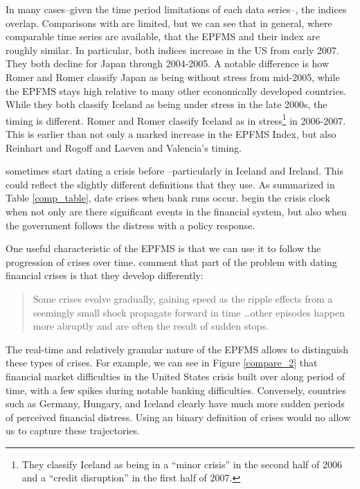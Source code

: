 \documentclass[]{article}
\begin{document}
In many cases--given the time period limitations of each data series--,
the indices overlap. Comparisons with \cite{Romer2015} are limited, but we can see that in general, where comparable time series are available, that the EPFMS and their index are roughly similar. In particular, both indices increase in the US from early 2007. They both decline for Japan through 2004-2005. A notable difference is
how Romer and Romer classify Japan as being without stress from
mid-2005, while the EPFMS stays high relative to many other economically
developed countries. While they both classify Iceland as being under
stress in the late 2000s, the timing is different. Romer and
Romer classify Iceland as in stress\footnote{They classify Iceland as
  being in a ``minor crisis'' in the second half of 2006 and a ``credit
  disruption'' in the first half of 2007.} in 2006-2007. This is earlier
than not only a marked increase in the EPFMS Index, but also Reinhart
and Rogoff and Laeven and Valencia's timing.

\cite{Reinhart2009} sometimes start dating a crisis before \cite{laeven2013}--particularly in Iceland and Ireland. This could reflect the slightly different definitions that they use. As summarized in Table \ref{comp_table}, \cite{Reinhart2009} date crises when bank runs occur. \cite{laeven2013} begin the crisis clock when not only are there significant events in the financial system, but also when the government follows the distress with a policy response.

One useful characteristic of the EPFMS is that we can use it to follow the
progression of crises over time. \cite[227]{laeven2013} comment
that part of the problem with dating financial crises is that they
develop differently:

\begin{quote}
    Some crises evolve gradually, gaining speed as the ripple effects from a seemingly small shock propagate forward in time \ldots other episodes happen more abruptly and are often the result of sudden stops.
\end{quote}

The real-time and relatively granular nature of the EPFMS allows to
distinguish these types of crises. For example, we can see in Figure
\ref{compare_2} that financial market difficulties in the United States
crisis built over along period of time, with a few spikes during notable
banking difficulties. Conversely, countries such as Germany, Hungary,
and Iceland clearly have much more sudden periods of perceived financial
distress. Using an binary definition of crises would no allow us to
capture these trajectories.
\end{document}
